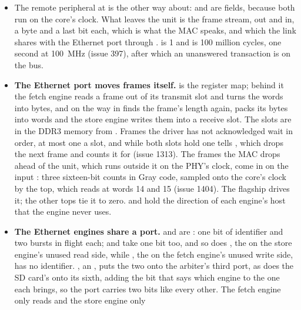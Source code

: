 \begin{itemize}
of its own and the crossing is the board top's business. A board with
nothing there ties them off, and a program that touched 
on such a board would wait for ever.
\item The remote peripheral at  is the other way about:
 and  are fields, because both run on the
core's clock. What leaves the unit is the frame stream, 
out and  in, a byte and a last bit each, which is what
the MAC speaks, and which the link shares with the Ethernet port
through .  is 1 and  is
100 million cycles, one second at 100~MHz (issue 397), after which an
unanswered transaction is  on the bus.
\item \textbf{The Ethernet port moves frames itself.}  is
the register map; behind it the fetch engine reads a frame out of its
transmit slot and  turns the words into bytes, and on
the way in  finds the frame's length again,
 packs its bytes into words and the store engine writes
them into a receive slot. The slots are in the DDR3 memory from
. Frames the driver has not acknowledged wait in
order, at most one a slot, and while both slots hold one 
tells , which drops the next frame and counts it for
 (issue 1313). The frames the MAC drops ahead of the
unit, which runs outside it on the PHY's clock, come in on the input
: three sixteen-bit counts in Gray code, sampled onto
the core's clock by the top, which  reads at words 14 and 15
(issue 1404). The flagship drives it; the other tops tie it to zero.
 and  hold the
direction of each engine's host that the engine never uses.
\item \textbf{The Ethernet engines share a port.}  and
 are : one bit of
identifier and two bursts in flight each;  and
 take one bit too, and so does , the
 on the store engine's unused read side, while
, the  on the fetch engine's unused write
side, has no identifier. , an , puts the two onto the arbiter's third port, as 
does the SD card's onto its sixth, adding the bit that says which
engine to the one each brings, so the port carries two bits like
every other. The fetch engine only reads and the store engine only

\end{itemize}
